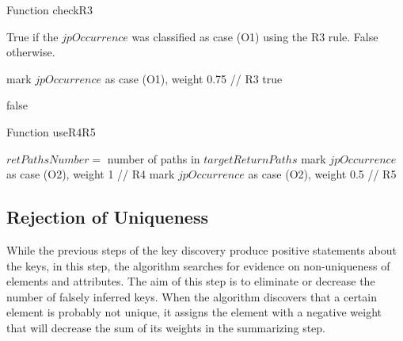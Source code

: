 \begin{algorithm}
\caption{Function checkR3}
\label{ALG_function_check_r3}
\begin{algorithmic}[1]

\ENSURE True if the $jpOccurrence$ was classified as case (O1) using the R3 rule. False otherwise.

        \STATE mark $jpOccurrence$ as case (O1), weight 0.75 // R3
        \RETURN true
    \ENDIF
\ENDFOR

\RETURN false
\end{algorithmic}
\end{algorithm}

\begin{algorithm}
\caption{Function useR4R5}
\label{ALG_function_use_r4_r5}
\begin{algorithmic}[1]

\STATE $retPathsNumber = $ number of paths in $targetReturnPaths$
	\STATE mark $jpOccurrence$ as case (O2), weight 1 // R4
\ELSE
	\STATE mark $jpOccurrence$ as case (O2), weight 0.5 // R5
\ENDIF
\end{algorithmic}
\end{algorithm}

\subsection{Rejection of Uniqueness}
While the previous steps of the key discovery produce positive statements about the keys, in this step, the algorithm searches for evidence on non-uniqueness of elements and attributes. The aim of this step is to eliminate or decrease the number of falsely inferred keys.
When the algorithm discovers that a certain element is probably not unique, it assigns the element with a negative weight that will decrease the sum of its weights in the summarizing step.

